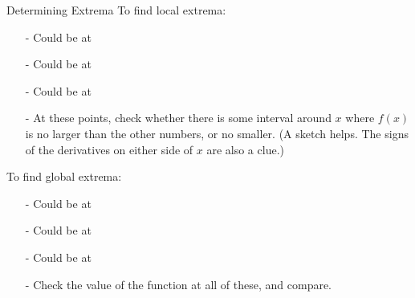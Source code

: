 \begin{frame}[t]{Determining Extrema}
\AnswerSpace{}
To find \textcolor{C3}{local extrema}:
\begin{itemize}
\item[-] Could be at 
\item[-] Could be at 
\item[-] Could be at 
\item[-] At these points, check whether there is some interval around $x$ where $f(x)$ is no larger than the other numbers, or no smaller. (A sketch helps. The signs of the derivatives on either side of $x$ are also a clue.)\end{itemize}

To find \textcolor{C3}{global extrema}:
\begin{itemize}
\item[-] Could be at 
\item[-] Could be at 
\item[-] Could be at 
\item[-] Check the value of the function at all of these, and compare.
 \end{itemize}
\end{frame}

